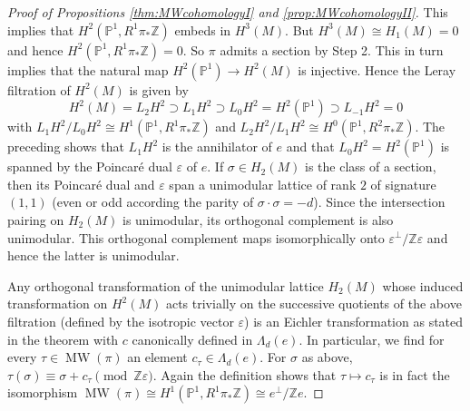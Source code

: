 \documentclass[10pt,a4paper]{amsart}
\def\PP{{\mathbb P}}
\def\ZZ{{\mathbb Z}}
\newcommand\MW{\operatorname{MW}}
\newcommand{\eps}{\varepsilon}
\begin{document}
\begin{proof}[Proof of  Propositions  \ref{thm:MWcohomologyI} and \ref{prop:MWcohomologyII}]
This implies that $H^2(\PP^1, R^1\pi_*\ZZ)$ embeds in $H^3(M)$. But $H^3(M)\cong H_1(M)=0$ and hence $H^2(\PP^1, R^1\pi_*\ZZ)=0$.
So $\pi$ admits a section by Step 2. This in turn implies that the natural map $H^2(\PP^1)\to H^2(M)$ is injective.
Hence the Leray filtration  of  $H^2(M)$ is given by 
\[
H^2(M)=L_2H^2\supset L_1H^2\supset L_0H^2=H^2(\PP^1)\supset L_{-1}H^2=0
\]
with $L_1H^2/L_0H^2\cong H^1(\PP^1, R^1\pi_*\ZZ)$ and $L_2H^2/L_1H^2\cong  H^0(\PP^1, R^2\pi_*\ZZ)$. 
The preceding shows that $L_1H^2$ is the annihilator of $e$ and that $L_0H^2=H^2(\PP^1)$ is spanned by the Poincar\'e dual $\eps $ of $e$. If $\sigma\in H_2(M)$ is the class of  a section, then its Poincar\'e dual and $\eps $ span a unimodular lattice of rank $2$  of signature  $(1,1)$ (even or odd according the parity of $\sigma\cdot\sigma=-d$).  
Since the intersection pairing on $H_2(M)$ is unimodular, its orthogonal complement is also unimodular. This 
orthogonal complement maps isomorphically onto $\eps ^\perp/\ZZ \eps $ and hence the latter  is unimodular. 

Any orthogonal transformation of the unimodular lattice  $H_2(M)$ whose induced transformation on $H^2(M)$ acts trivially on the successive quotients of the above filtration (defined by the isotropic vector $\eps$) is an Eichler transformation as stated in the theorem  with $c$ canonically defined in $\Lambda_d(e)$. In particular, we find for every $\tau\in \MW(\pi)$ an element $c_\tau\in \Lambda_d(e)$. For $\sigma$  as above,  $\tau (\sigma)\equiv \sigma+c_\tau\pmod{\ZZ \eps }$.
Again the  definition shows that $\tau\mapsto c_\tau$ is in fact the isomorphism $\MW(\pi)\cong H^1(\PP^1, R^1\pi_*\ZZ)\cong e^\perp/\ZZ e$. 
\end{proof}
\end{document}
